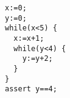 \begin{lstlisting}[]  % Start your code-block
x:=0;
y:=0;
while(x<5) {
  x:=x+1;
  while(y<4) {
    y:=y+2;
  }
}
assert y==4;
\end{lstlisting}